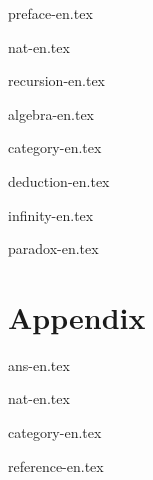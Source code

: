 \documentclass[b5paper,twoside]{book}
\begin{document}
\frontmatter
{preface-en.tex}


\tableofcontents
\newpage

\mainmatter

{nat-en.tex}

{recursion-en.tex}

{algebra-en.tex}

{category-en.tex}

{deduction-en.tex}

{infinity-en.tex}

{paradox-en.tex}

\part*{Appendix}
\appendix
\noappendicestocpagenum
\addappheadtotoc

\backmatter
{ans-en.tex}

{nat-en.tex}

{category-en.tex}

{reference-en.tex}

\printindex


\end{document}
